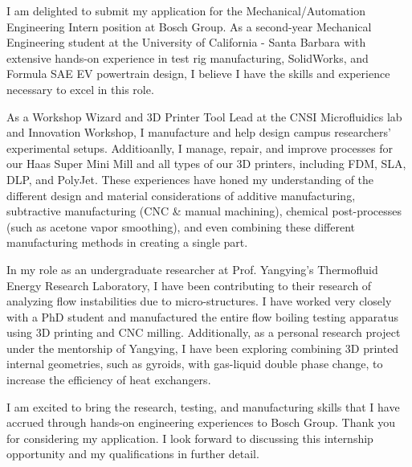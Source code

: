 \documentclass[11pt, letterpaper]{awesome-cv} %
\begin{document}
\makecvheader %

\makelettertitle %


\begin{cvletter}


I am delighted to submit my application for the Mechanical/Automation Engineering Intern position at Bosch Group. As a second-year Mechanical Engineering student at the University of California - Santa Barbara with extensive hands-on experience in test rig manufacturing, SolidWorks, and Formula SAE EV powertrain design, I believe I have the skills and experience necessary to excel in this role.

As a Workshop Wizard and 3D Printer Tool Lead at the CNSI Microfluidics lab and Innovation Workshop, I manufacture and help design campus researchers' experimental setups. Additioanlly, I manage, repair, and improve processes for our Haas Super Mini Mill and all types of our 3D printers, including FDM, SLA, DLP, and PolyJet. These experiences have honed my understanding of the different design and material considerations of additive manufacturing, subtractive manufacturing (CNC \& manual machining), chemical post-processes (such as acetone vapor smoothing), and even combining these different manufacturing methods in creating a single part.

In my role as an undergraduate researcher at Prof. Yangying's Thermofluid Energy Research Laboratory, I have been contributing to their research of analyzing flow instabilities due to micro-structures. I have worked very closely with a PhD student and manufactured the entire flow boiling testing apparatus using 3D printing and CNC milling. Additionally, as a personal research project under the mentorship of Yangying, I have been exploring combining 3D printed internal geometries, such as gyroids, with gas-liquid double phase change, to increase the efficiency of heat exchangers. 

I am excited to bring the research, testing, and manufacturing skills that I have accrued through hands-on engineering experiences to Bosch Group. Thank you for considering my application. I look forward to discussing this internship opportunity and my qualifications in further detail.


\end{cvletter}


\makeletterclosing %
\end{document}
